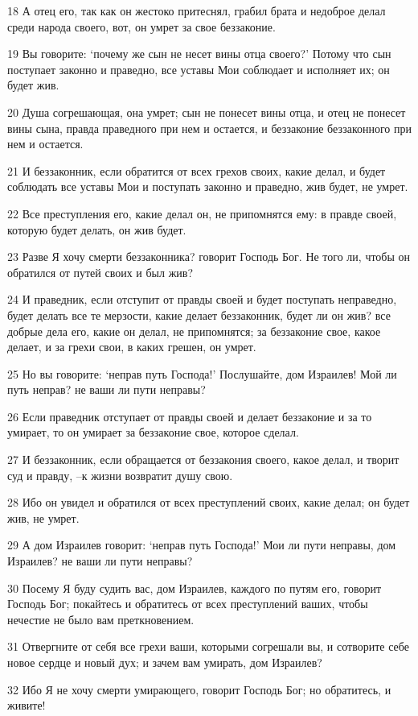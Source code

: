 \par 18 А отец его, так как он жестоко притеснял, грабил брата и недоброе делал среди народа своего, вот, он умрет за свое беззаконие.
\par 19 Вы говорите: `почему же сын не несет вины отца своего?' Потому что сын поступает законно и праведно, все уставы Мои соблюдает и исполняет их; он будет жив.
\par 20 Душа согрешающая, она умрет; сын не понесет вины отца, и отец не понесет вины сына, правда праведного при нем и остается, и беззаконие беззаконного при нем и остается.
\par 21 И беззаконник, если обратится от всех грехов своих, какие делал, и будет соблюдать все уставы Мои и поступать законно и праведно, жив будет, не умрет.
\par 22 Все преступления его, какие делал он, не припомнятся ему: в правде своей, которую будет делать, он жив будет.
\par 23 Разве Я хочу смерти беззаконника? говорит Господь Бог. Не того ли, чтобы он обратился от путей своих и был жив?
\par 24 И праведник, если отступит от правды своей и будет поступать неправедно, будет делать все те мерзости, какие делает беззаконник, будет ли он жив? все добрые дела его, какие он делал, не припомнятся; за беззаконие свое, какое делает, и за грехи свои, в каких грешен, он умрет.
\par 25 Но вы говорите: `неправ путь Господа!' Послушайте, дом Израилев! Мой ли путь неправ? не ваши ли пути неправы?
\par 26 Если праведник отступает от правды своей и делает беззаконие и за то умирает, то он умирает за беззаконие свое, которое сделал.
\par 27 И беззаконник, если обращается от беззакония своего, какое делал, и творит суд и правду, --к жизни возвратит душу свою.
\par 28 Ибо он увидел и обратился от всех преступлений своих, какие делал; он будет жив, не умрет.
\par 29 А дом Израилев говорит: `неправ путь Господа!' Мои ли пути неправы, дом Израилев? не ваши ли пути неправы?
\par 30 Посему Я буду судить вас, дом Израилев, каждого по путям его, говорит Господь Бог; покайтесь и обратитесь от всех преступлений ваших, чтобы нечестие не было вам преткновением.
\par 31 Отвергните от себя все грехи ваши, которыми согрешали вы, и сотворите себе новое сердце и новый дух; и зачем вам умирать, дом Израилев?
\par 32 Ибо Я не хочу смерти умирающего, говорит Господь Бог; но обратитесь, и живите!

